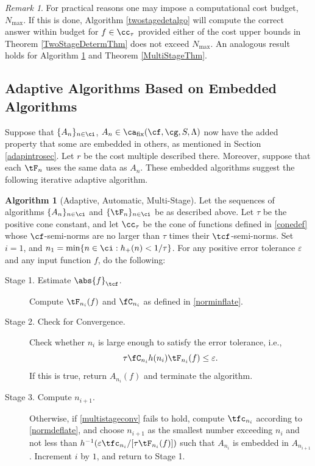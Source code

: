 \documentclass[]{elsarticle}
\DeclareMathOperator{\fix}{fix}
\theoremstyle{definition}
\newtheorem{algo}{Algorithm}
\theoremstyle{remark}
\newtheorem{rem}{Remark}
\newcommand{\Ftnorm}[1]{\abs{#1}_{\tcf}}
\begin{document}
\begin{rem} \label{Nmaxrem}  For practical reasons one may impose a computational cost budget, $N_{\max}$.  If this is done, Algorithm \ref{twostagedetalgo} will compute the correct answer within budget for $f \in \cc_{\tau}$ provided either of the cost upper bounds in Theorem \ref{TwoStageDetermThm} does not exceed $N_{\max}$.  An analogous result holds for Algorithm \ref{multistagealgo} and Theorem \ref{MultiStageThm}.
\end{rem}

\subsection{Adaptive Algorithms Based on Embedded Algorithms}

Suppose that $\{A_n\}_{n \in \ci}$, $A_n  \in \ca_{\fix}(\cf,\cg,S,\Lambda)$ now have the added property that some are embedded in others, as mentioned in Section \ref{adapintrosec}.  Let $r$ be the cost multiple described there.  Moreover, suppose that each $\tF_n$ uses the same data as $A_n$. These embedded algorithms suggest the following iterative adaptive algorithm.

\begin{algo}[Adaptive, Automatic, Multi-Stage] \label{multistagealgo}  Let the sequences of algorithms $\{A_n\}_{n \in \ci}$ and  $\{\tF_n\}_{n \in \ci}$ be as described above.  Let $\tau$ be the positive cone constant, and let $\cc_\tau$ be the cone of functions defined in \eqref{conedef} whose $\cf$-semi-norms are no larger than $\tau$ times their $\tcf$-semi-norms. Set $i=1$, and $n_1 = \min\{ n \in \ci : h_+(n) < 1/\tau\}$. For any positive error tolerance $\varepsilon$ and any input function $f$, do the following:
\begin{description}

\item [Stage 1. Estimate $\Ftnorm{f}$.] Compute $\tF_{n_i}(f)$ and $\fC_{n_i}$ as defined in \eqref{norminflate}.  

\item [Stage 2. Check for Convergence.] Check whether $n_i$ is large enough to satisfy the error tolerance, i.e., 
\begin{equation} \label{multistageconv}
\tau \fC_{n_i} h(n_i)\tF_{n_i}(f) \le \varepsilon.
\end{equation}
If this is true, return $A_{n_i}(f)$ and terminate the algorithm.

\item[Stage 3. Compute $n_{i+1}$.]  Otherwise, if \eqref{multistageconv} fails to hold, compute $\tfc_{n_i}$ according to \eqref{normdeflate}, and choose $n_{i+1}$ as the smallest number exceeding $n_i$ and not less than $h^{-1}(\varepsilon \tfc_{n_i}/[\tau \tF_{n_i}(f)])$ such that $A_{n_{i}}$ is embedded in $A_{n_{i+1}}$. Increment $i$ by $1$, and return to Stage 1.  

\end{description}  
\end{algo}
\end{document}
